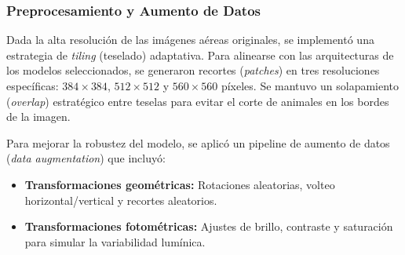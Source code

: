 \begin{table}[ht]
\centering
\caption{Distribución de individuos por especie en los conjuntos de entrenamiento, validación y prueba.}
\label{tab:dataset_dist}
\end{table}


\subsubsection{Preprocesamiento y Aumento de Datos}
Dada la alta resolución de las imágenes aéreas originales, se implementó una estrategia de \textit{tiling} (teselado) adaptativa. Para alinearse con las arquitecturas de los modelos seleccionados, se generaron recortes (\textit{patches}) en tres resoluciones específicas: $384 \times 384$, $512 \times 512$ y $560 \times 560$ píxeles. Se mantuvo un solapamiento (\textit{overlap}) estratégico entre teselas para evitar el corte de animales en los bordes de la imagen.

Para mejorar la robustez del modelo, se aplicó un pipeline de aumento de datos (\textit{data augmentation}) que incluyó:
\begin{itemize}
    \item \textbf{Transformaciones geométricas:} Rotaciones aleatorias, volteo horizontal/vertical y recortes aleatorios.
    \item \textbf{Transformaciones fotométricas:} Ajustes de brillo, contraste y saturación para simular la variabilidad lumínica.
\end{itemize}


